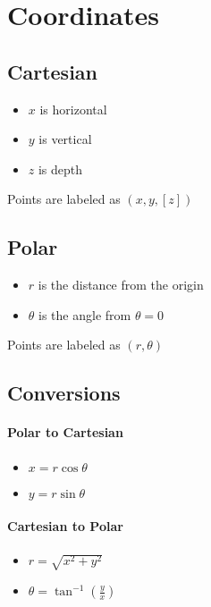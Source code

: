 \documentclass[]{article}
\begin{document}
\section*{Coordinates}
\subsection*{Cartesian}
\begin{itemize}
    \item $x$ is horizontal
    \item $y$ is vertical
    \item $z$ is depth
\end{itemize}
Points are labeled as $(x,y,[z])$\\
\subsection*{Polar}
\begin{itemize}
    \item $r$ is the distance from the origin
    \item $\theta$ is the angle from $\theta=0$
\end{itemize}
Points are labeled as $(r,\theta)$\\
\subsection*{Conversions}
\paragraph*{Polar to Cartesian}
\begin{itemize}
    \item $x = r\cos\theta$
    \item $y = r\sin\theta$
\end{itemize}
\paragraph*{Cartesian to Polar}
\begin{itemize}
    \item $r = \sqrt{x^2 + y^2}$
    \item $\theta = \tan^{-1}\left(\frac{y}{x}\right)$
\end{itemize}
\end{document}

